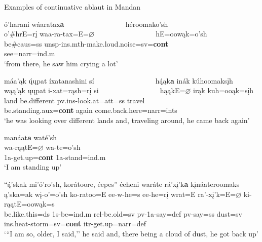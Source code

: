 \begin{exe}

\item\label{continuativeablaut} Examples of continuative ablaut in Mandan

	\begin{xlist}
	
	\item\label{continuativeablaut1}
	
	\glll ó'harani wáaratax\textbf{a} ~ ~ ~ ~ ~ ~ ~ ~ ~ ~ héroomako'sh\\
	o'\#hrE=rį waa-ra-tax=E=$\varnothing$ ~ ~ ~ ~ ~ ~ ~ ~ ~ ~  hE=oowąk=o'sh\\
	\textnormal{be}\#caus=ss unsp-ins.mth-\textnormal{make.loud.noise}=sv=\textbf{cont} ~ ~ ~ ~ ~ ~ ~ ~ ~ ~ \textnormal{see}=narr=ind.m\\
	\glt `from there, he saw him crying a lot' \citep[14]{hollow1973b}

	\item\label{continuativeablaut2}

	\glll máa'ąk ų́ųpat íxatanashini sí ~ ~ ~ ~ ~ ~ ~ ~ ~ ~ hą́ąk\textbf{a} inák kúhoomaksįh\\
	wąą'ąk ųųpat i-xat=rąsh=rį si ~ ~ ~ ~ ~ ~ ~ ~ ~ ~ hąąkE=$\varnothing$ irąk kuh=ooąk=sįh\\
	\textnormal{land} \textnormal{be.different} pv.ins-\textnormal{look.at}=att=ss  \textnormal{travel} ~ ~ ~ ~ ~ ~ ~ ~ ~ ~ \textnormal{be.standing}.aux=\textbf{cont} \textnormal{again} \textnormal{come.back.here}=narr=ints\\
	\glt `he was looking over different lands and, traveling around, he came back again' \citep[8]{hollow1973a} 
	

	\item\label{continuativeablaut4}
	
	\glll manáat\textbf{a} waté'sh\\
	wa-rąątE=$\varnothing$ wa-te=o'sh\\
	1a-\textnormal{get.up}=\textbf{cont} 1a-\textnormal{stand}=ind.m\\
	\glt `I am standing up' \citep[173]{hollow1970}

	\item\label{continuativeablaut3}
	
	\glll ``ą́'skak mi'ó'ro'sh, korátoore, éepes'' éeheni  waráte rá'xį'k\textbf{a} kįnáateroomaks\\
	ą'ska=ak wį-o'=o'sh ko-ratoo=E ee-w-he=s ee-he=rį wrat=E ra'-xį'k=E=$\varnothing$ ki-rąątE=oowąk=s\\
	\textnormal{be.like.this}=ds 1s-\textnormal{be}=ind.m rel-\textnormal{be.old}=sv pv-1a-\textnormal{say}=def pv-\textnormal{say}=ss \textnormal{dust}=sv ins.heat-\textnormal{storm}=sv=\textbf{cont} itr-\textnormal{get.up}=narr=def\\
	\glt `{``}I am so, older, I said,'' he said and, there being a cloud of dust, he got back up' \citep[9]{hollow1973a}


\end{xlist}
\end{exe}
